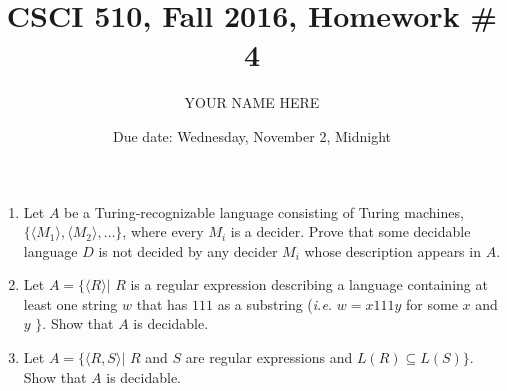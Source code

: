\documentclass{article}
\title{CSCI 510, Fall 2016, Homework \# 4}
\author{YOUR NAME HERE}
\date{Due date: Wednesday, November 2, Midnight}
\begin{document}
\maketitle
\begin{enumerate}
  \item Let $A$ be a Turing-recognizable language consisting of Turing
    machines, $\{\langle M_1 \rangle, \langle M_2\rangle, \ldots\}$,
    where every $M_i$ is a decider.  Prove that some decidable
    language $D$ is not decided by any decider $M_i$ whose description
    appears in $A$.

    \item Let $A= \{\langle R\rangle | $ $R$ is a regular
      expression describing a language containing at least one string
      $w$ that has  $111$  as a substring ({\em i.e.} $w=x111y$ for
      some $x$ and $y$ $\}$.  Show that $A$ is decidable.

    \item Let $A= \{\langle R, S\rangle |$ $R$ and $S$ are regular
      expressions and $L(R) \subseteq L(S)\}$.  Show that $A$ is
      decidable. 

\end{enumerate}
\end{document}

